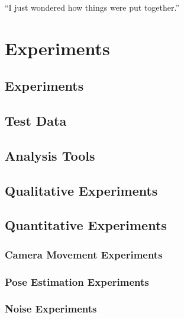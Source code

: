 \begin{savequote}[8cm]
  ``I just wondered how things were put together.''
\end{savequote}
\makeatletter
\chapter{Experiments}

\section{Experiments}

\section{Test Data}



\section{Analysis Tools}

\section{Qualitative Experiments}

\section{Quantitative Experiments}

\subsection{Camera Movement Experiments}

\subsection{Pose Estimation Experiments}

\subsection{Noise Experiments}




